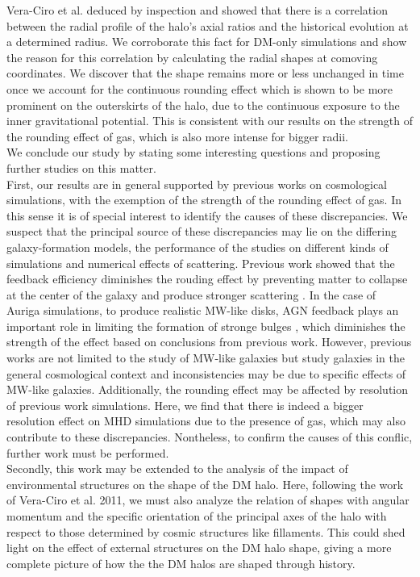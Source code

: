 Vera-Ciro et al. deduced by inspection and showed that there is a correlation between the radial profile of the halo's axial ratios and the historical evolution at a determined radius. We corroborate this fact for DM-only simulations and show the reason for this correlation by calculating the radial shapes at comoving coordinates. We discover that the shape remains more or less unchanged in time once we account for the continuous rounding effect which is shown to be more prominent on the outerskirts of the halo, due to the continuous exposure to the inner gravitational potential. This is consistent with our results on the strength of the rounding effect of gas, which is also more intense for bigger radii.\\

We conclude our study by stating some interesting questions and proposing further studies on this matter.\\

First, our results are in general supported by previous works on cosmological simulations, with the exemption of the strength of the rounding effect of gas. In this sense it is of special interest to identify the causes of these discrepancies. We suspect that the principal source of these discrepancies may lie on the differing galaxy-formation models, the performance of the studies on different kinds of simulations and numerical effects of scattering. Previous work showed that the feedback efficiency diminishes the rouding effect by preventing matter to collapse at the center of the galaxy and produce stronger scattering \cite{}. In the case of Auriga simulations, to produce realistic MW-like disks, AGN feedback plays an important role in limiting the formation of stronge bulges \cite{Auriga}, which diminishes the strength of the effect based on conclusions from previous work. However, previous works are not limited to the study of MW-like galaxies but study galaxies in the general cosmological context \cite{studies} and inconsistencies may be due to specific effects of MW-like galaxies. Additionally, the rounding effect may be affected by resolution of previous work simulations. Here, we find that there is indeed a bigger resolution effect on MHD simulations due to the presence of gas, which may also contribute to these discrepancies. Nontheless, to confirm the causes of this conflic, further work must be performed.\\

Secondly, this work may be extended to the analysis of the impact of environmental structures on the shape of the DM halo. Here, following the work of Vera-Ciro et al. 2011, we must also analyze the relation of shapes with angular momentum and the specific orientation of the principal axes of the halo with respect to those determined by cosmic structures like fillaments. This could shed light on the effect of external structures on the DM halo shape, giving a more complete picture of how the the DM halos are shaped through history.\\


